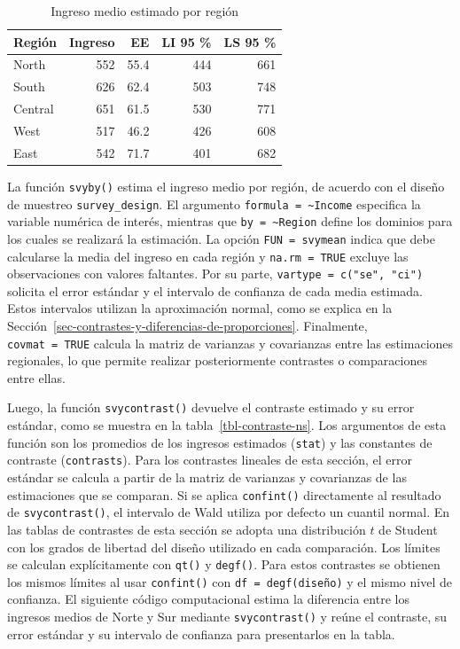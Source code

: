 \documentclass[
  spanish,
  11pt,
  letterpaper,
  oneside,
  open=any]{scrbook}
\begin{document}
{

\begin{longtable}[]{@{}lrrrr@{}}

\caption{\label{tbl-prom-region}Ingreso medio estimado por región}

\tabularnewline

\toprule\noalign{}
Región & Ingreso & EE & LI 95 \% & LS 95 \% \\
\midrule\noalign{}
\endhead
\bottomrule\noalign{}
\endlastfoot
North & 552 & 55.4 & 444 & 661 \\
South & 626 & 62.4 & 503 & 748 \\
Central & 651 & 61.5 & 530 & 771 \\
West & 517 & 46.2 & 426 & 608 \\
East & 542 & 71.7 & 401 & 682 \\

\end{longtable}

}

La función \texttt{svyby()} estima el ingreso medio por región, de
acuerdo con el diseño de muestreo \texttt{survey\_design}. El argumento
\texttt{formula\ =\ \textasciitilde{}Income} especifica la variable
numérica de interés, mientras que
\texttt{by\ =\ \textasciitilde{}Region} define los dominios para los
cuales se realizará la estimación. La opción \texttt{FUN\ =\ svymean}
indica que debe calcularse la media del ingreso en cada región y
\texttt{na.rm\ =\ TRUE} excluye las observaciones con valores faltantes.
Por su parte, \texttt{vartype\ =\ c("se",\ "ci")} solicita el error
estándar y el intervalo de confianza de cada media estimada. Estos
intervalos utilizan la aproximación normal, como se explica en la
Sección~\ref{sec-contrastes-y-diferencias-de-proporciones}. Finalmente,
\texttt{covmat\ =\ TRUE} calcula la matriz de varianzas y covarianzas
entre las estimaciones regionales, lo que permite realizar
posteriormente contrastes o comparaciones entre ellas.

Luego, la función \texttt{svycontrast()} devuelve el contraste estimado
y su error estándar, como se muestra en la tabla~\ref{tbl-contraste-ns}.
Los argumentos de esta función son los promedios de los ingresos
estimados (\texttt{stat}) y las constantes de contraste
(\texttt{contrasts}). Para los contrastes lineales de esta sección, el
error estándar se calcula a partir de la matriz de varianzas y
covarianzas de las estimaciones que se comparan. Si se aplica
\texttt{confint()} directamente al resultado de \texttt{svycontrast()},
el intervalo de Wald utiliza por defecto un cuantil normal. En las
tablas de contrastes de esta sección se adopta una distribución \(t\) de
Student con los grados de libertad del diseño utilizado en cada
comparación. Los límites se calculan explícitamente con \texttt{qt()} y
\texttt{degf()}. Para estos contrastes se obtienen los mismos límites al
usar \texttt{confint()} con \texttt{df\ =\ degf(diseño)} y el mismo
nivel de confianza. El siguiente código computacional estima la
diferencia entre los ingresos medios de Norte y Sur mediante
\texttt{svycontrast()} y reúne el contraste, su error estándar y su
intervalo de confianza para presentarlos en la tabla.
\end{document}
